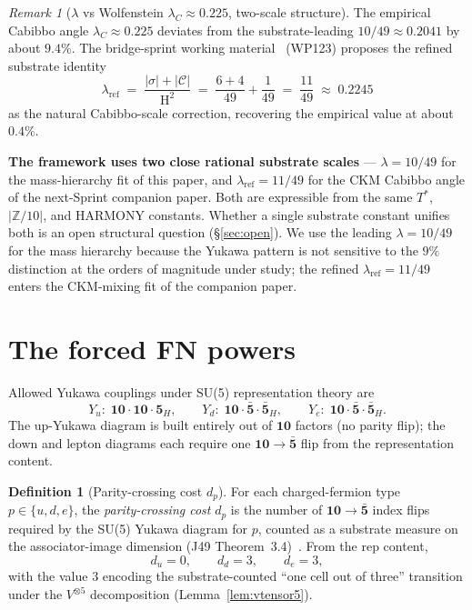 \documentclass[11pt,reqno]{amsart}
\theoremstyle{plain}
\theoremstyle{definition}
\newtheorem{definition}[theorem]{Definition}
\theoremstyle{remark}
\newtheorem*{remark}{Remark}
\newcommand{\Z}{\mathbb{Z}}
\DeclareMathOperator{\HARM}{H}    %
\newcommand{\Cfour}{\mathcal{C}}  %
\newcommand{\rep}[1]{\mathbf{#1}}
\newcommand{\barrep}[1]{\bar{\mathbf{#1}}}
\begin{document}
\begin{remark}[$\lambda$ vs Wolfenstein $\lambda_{C} \approx 0.225$, two-scale structure]\label{rem:lambda}
The empirical Cabibbo angle $\lambda_{C} \approx 0.225$
deviates from the substrate-leading $10/49 \approx 0.2041$ by
about $9.4\%$. The bridge-sprint working
material~\cite{SandersBridgeSprint2026} (WP123) proposes the
refined substrate identity
\[
  \lambda_{\mathrm{ref}} \;=\;
  \frac{|\sigma| + |\Cfour|}{\HARM^{2}}
  \;=\; \frac{6 + 4}{49} + \frac{1}{49}
  \;=\; \frac{11}{49}
  \;\approx\; 0.2245
\]
as the natural Cabibbo-scale correction, recovering the
empirical value at about $0.4\%$.

\textbf{The framework uses two close rational substrate
scales} --- $\lambda = 10/49$ for the mass-hierarchy fit of
this paper, and $\lambda_{\mathrm{ref}} = 11/49$ for the CKM
Cabibbo angle of the next-Sprint companion paper. Both are
expressible from the same $T^{*}$, $|\Z/10|$, and HARMONY
constants. Whether a single substrate constant unifies both
is an open structural question (\S\ref{sec:open}). We use the
leading $\lambda = 10/49$ for the mass hierarchy because the
Yukawa pattern is not sensitive to the $9\%$ distinction at
the orders of magnitude under study; the refined
$\lambda_{\mathrm{ref}} = 11/49$ enters the CKM-mixing fit
of the companion paper.
\end{remark}

\section{The forced FN powers}\label{sec:powers}

Allowed Yukawa couplings under SU(5) representation theory are
\[
  Y_{u}\colon\; \rep{10} \cdot \rep{10} \cdot \rep{5}_{H},\qquad
  Y_{d}\colon\; \rep{10} \cdot \barrep{5} \cdot \barrep{5}_{H},\qquad
  Y_{e}\colon\; \rep{10} \cdot \barrep{5} \cdot \barrep{5}_{H}.
\]
The up-Yukawa diagram is built entirely out of $\rep{10}$
factors (no parity flip); the down and lepton diagrams each
require one $\rep{10} \to \barrep{5}$ flip from the
representation content.

\begin{definition}[Parity-crossing cost $d_{p}$]\label{def:dp}
For each charged-fermion type $p \in \{u, d, e\}$, the
\emph{parity-crossing cost} $d_{p}$ is the number of
$\rep{10} \to \barrep{5}$ index flips required by the SU(5)
Yukawa diagram for $p$, counted as a substrate measure on
the associator-image dimension (J49
Theorem~3.4)~\cite{SandersGish2026DiscreteDirac}. From the
rep content,
\[
  d_{u} = 0,\qquad d_{d} = 3,\qquad d_{e} = 3,
\]
with the value $3$ encoding the substrate-counted
``one cell out of three'' transition under the $V^{\otimes 5}$
decomposition (Lemma~\ref{lem:vtensor5}).
\end{definition}
\end{document}
